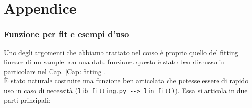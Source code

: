 \documentclass[11pt, a4paper]{article}
\begin{document}






\newpage
\null 
\clearpage
\newpage
\null 
\clearpage





\part*{\Huge Appendice}


\section*{Funzione per fit e esempi d'uso}
\label{App: funzione fit}

Uno degli argomenti che abbiamo trattato nel corso è proprio quello del fitting lineare di un sample con una data funzione: questo è stato ben discusso in particolare nel Cap. \ref{Cap: fitting}.\\
È stato naturale costruire una funzione ben articolata che potesse essere di rapido uso in caso di necessità (\lstinline|lib_fitting.py --> lin_fit()|). Essa si articola in due parti principali:
\end{document}
